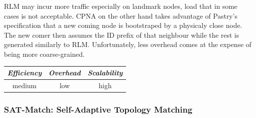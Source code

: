 RLM may incur more traffic especially on landmark nodes, load that in some cases
is not acceptable. CPNA on the other hand takes advantage of Pastry's
specification that a new coming node is bootstraped by a physicaly close node.
The new comer then assumes the ID prefix of that neighbour while the rest is
generated similarly to RLM. Unfortunately, less overhead comes at the expense
of being more coarse-grained.

%
%
%

\begin{center}
\begin{tabular}{ccc}
\emph{Efficiency} & \emph{Overhead} & \emph{Scalability} \\
\hline
%
medium &
low &
high
\end{tabular}
\end{center}

\subsubsection{SAT-Match: Self-Adaptive Topology Matching}


